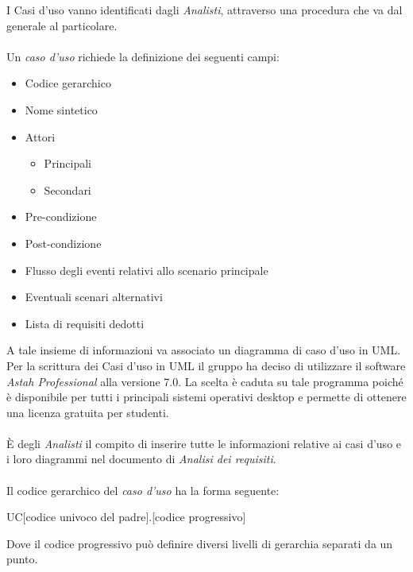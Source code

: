 \documentclass[a4paper]{article}
\begin{document}
			 I Casi d'uso vanno identificati dagli \emph{Analisti}, attraverso una procedura che va dal
			 generale al particolare.
			  \\ \\
			 Un \emph{caso d'uso} richiede la definizione dei seguenti campi:
			 \begin{itemize}
			 	\item Codice gerarchico
			 	\item Nome sintetico
			 	\item Attori
			 	\begin{itemize}
			 		\item Principali
			 		\item Secondari
			 	\end{itemize}
			 	\item Pre-condizione
			 	\item Post-condizione
			 	\item Flusso degli eventi relativi allo scenario principale
			 	\item Eventuali scenari alternativi
			 	\item Lista di requisiti dedotti
			 \end{itemize}
			 A tale insieme di informazioni va associato un diagramma di caso d'uso in UML. Per la
			 scrittura dei Casi d'uso in UML il gruppo ha deciso di utilizzare il software
			  \emph{Astah Professional} alla versione 7.0. La scelta è  caduta su tale programma poiché
			  è disponibile per tutti i principali sistemi operativi desktop e permette di
			   ottenere una licenza gratuita per studenti.
			  \\ \\
			  È degli \emph{Analisti} il compito di inserire tutte le informazioni relative ai casi
			  d'uso e i loro diagrammi nel documento di \emph{Analisi dei requisiti}.
			  \\ \\
			 Il codice gerarchico del \emph{caso d'uso} ha la forma seguente:
			 \begin{center}
			 	UC[codice univoco del padre].[codice progressivo]
			 \end{center}
			 Dove il codice progressivo può definire diversi livelli di gerarchia separati da un punto.
\end{document}
